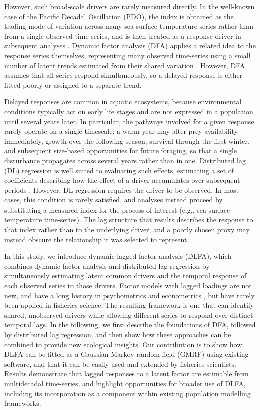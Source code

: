 \documentclass[12pt]{article}
\begin{document}
However, such broad-scale drivers are rarely measured directly. In the
well-known case of the Pacific Decadal Oscillation (PDO), the index is
obtained as the leading mode of variation across many sea surface
temperature series rather than from a single observed time-series, and
is then treated as a response driver in subsequent analyses
\citep{mantua_1997}. Dynamic factor analysis (DFA) applies a related
idea to the response series themselves, representing many observed
time-series using a small number of latent trends estimated from their
shared variation \citep{zuur_estimating_2003, zuur_dynamic_2003,
holmes_2012}. However, DFA assumes that all series respond
simultaneously, so a delayed response is either fitted poorly or
assigned to a separate trend.

Delayed responses are common in aquatic ecosystems, because
environmental conditions typically act on early life stages and are not
expressed in a population until several years later. In particular, the
pathways involved for a given response rarely operate on a single
timescale: a warm year may alter prey availability immediately, growth
over the following season, survival through the first winter, and
subsequent size-based opportunities for future foraging, so that a
single disturbance propagates across several years rather than in one.
Distributed lag (DL) regression is well suited to evaluating such
effects, estimating a set of coefficients describing how the effect of a
driver accumulates over subsequent periods \citep{clark_dynamic_2023}. However, DL
regression requires the driver to be observed. In most cases, this
condition is rarely satisfied, and analyses instead proceed by
substituting a measured index for the process of interest (e.g., sea
surface temperature time-series). The lag structure that results
describes the response to that index rather than to the underlying
driver, and a poorly chosen proxy may instead obscure the relationship
it was selected to represent.

In this study, we introduce dynamic lagged factor analysis (DLFA),
which combines dynamic factor analysis and distributed lag regression by
simultaneously estimating latent common drivers and the temporal
response of each observed series to those drivers. Factor models with
lagged loadings are not new, and have a long history in psychometrics
and econometrics \citep{molenaar_dynamic_1985, pena_identifying_1987,
forni_generalized_2000, stock_dynamic_2016}, but have rarely been
applied in fisheries science.
The resulting framework is one that can identify shared, unobserved
drivers while allowing different series to respond over distinct
temporal lags. In the
following, we first describe the foundations of DFA, followed by
distributed lag regression, and then show how these approaches can be
combined to provide new ecological insights. Our contribution is to
show how DLFA can be fitted as a Gaussian Markov random field (GMRF) \citep{rue_gaussian_2005} using
existing software, and that it can be easily used and extended by
fisheries scientists. Results demonstrate that lagged responses to a
latent factor are estimable from multidecadal time-series, and highlight
opportunities for broader use of DLFA, including its incorporation as a
component within existing population modelling frameworks.
\end{document}
